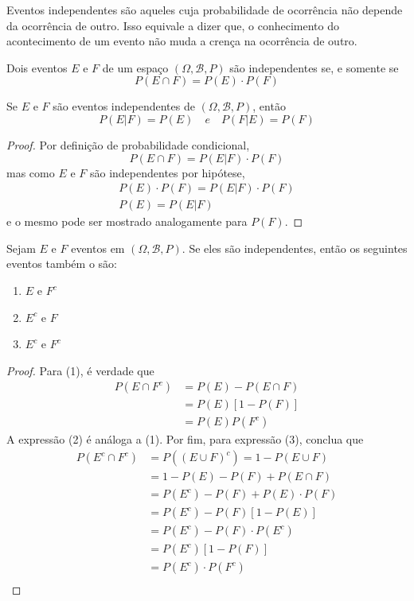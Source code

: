 Eventos independentes são aqueles cuja probabilidade de ocorrência não depende
da ocorrência de outro. Isso equivale a dizer que, o conhecimento do acontecimento
de um evento não muda a crença na ocorrência de outro.
\begin{def:independencia}
Dois eventos $E$ e $F$ de um espaço $(\Omega, \mathcal{B}, P)$ são independentes se, e
somente se
\[
	P(E \cap F) = P(E) \cdot P(F)
\]
\end{def:independencia}

\begin{prop:independencia}
Se $E$ e $F$ são eventos independentes de $(\Omega, \mathcal{B}, P)$, então
\[
	P(E | F) = P(E) \quad \mathit{ e }\quad P(F | E) = P(F)
\]
\begin{proof}
	Por definição de probabilidade condicional,
	\[
		P(E \cap F) = P(E|F) \cdot P(F)
	\]
	mas como $E$ e $F$ são independentes por hipótese,
	\begin{gather*}
		P(E) \cdot P(F) = P(E|F) \cdot P(F)\\
		P(E) = P(E|F)
	\end{gather*}
	e o mesmo pode ser mostrado analogamente para $P(F)$.
\end{proof}
\end{prop:independencia}

\begin{prop:independencia complementar}
\label{prop:independencia complementar}
Sejam $E$ e $F$ eventos em $(\Omega, \mathcal{B}, P)$.
Se eles são independentes, então os seguintes eventos também o são:
\begin{enumerate}
	\item $E$ e $F^c$
	\item $E^c$ e $F$
	\item $E^c$ e $F^c$
\end{enumerate}
\begin{proof}
	Para (1), é verdade que
	\begin{align*}
		P(E \cap F^c) & = P(E) - P(E \cap F) \\
		              & = P(E) [1 - P(F)]    \\
		              & = P(E) P(F^c)
	\end{align*}
	A expressão (2) é análoga a (1). Por fim, para expressão (3), conclua que
	\begin{align*}
		P(E^c \cap F^c) & = P((E \cup F)^c) = 1 - P(E \cup F) \\
		                & = 1 - P(E) - P(F) + P(E \cap F)     \\
		                & = P(E^c) - P(F) + P(E) \cdot P(F)   \\
		                & = P(E^c) - P(F) [1 - P(E)]          \\
		                & = P(E^c) - P(F) \cdot P(E^c)        \\
		                & = P(E^c) [1 - P(F)]                 \\
		                & = P(E^c) \cdot P(F^c)               \\
	\end{align*}
\end{proof}
\end{prop:independencia complementar}

